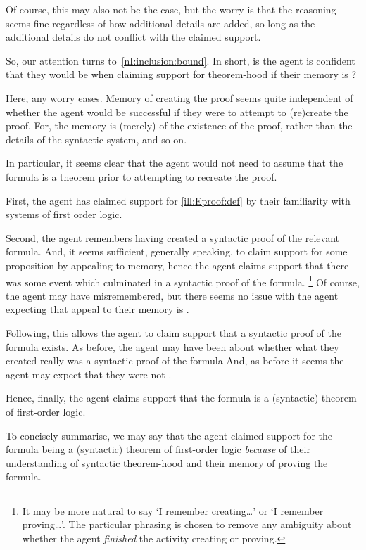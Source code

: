 \begin{note}[Memory]
{      Of course, this may also not be the case, but the worry is that the reasoning seems fine regardless of how additional details are added, so long as the additional details do not conflict with the claimed support.

      So, our attention turns to~\ref{nI:inclusion:bound}.
      In short, is the agent is confident that they would be \nmom{} when claiming support for theorem-hood if their memory is \nmom{}?

      Here, any worry eases.
      Memory of creating the proof seems quite independent of whether the agent would be successful if they were to attempt to (re)create the proof.
      For, the memory is (merely) of the existence of the proof, rather than the details of the syntactic system, and so on.

      In particular, it seems clear that the agent would not need to assume that the formula is a theorem prior to attempting to recreate the proof.
    }

  First, the agent has claimed support for \ref{ill:Eproof:def} by their familiarity with systems of first order logic.

  Second, the agent remembers having created a syntactic proof of the relevant formula.
  And, it seems sufficient, generally speaking, to claim support for some proposition by appealing to memory, hence the agent claims support that there was some event which culminated in a syntactic proof of the formula.\nolinebreak
  \footnote{
    It may be more natural to say `I remember creating\dots' or `I remember proving\dots'.
    The particular phrasing is chosen to remove any ambiguity about whether the agent \emph{finished} the activity creating or proving.
  }
  Of course, the agent may have misremembered, but there seems no issue with the agent expecting that appeal to their memory is \nmom{}.

  Following, this allows the agent to claim support that a syntactic proof of the formula exists.
  As before, the agent may have been \mom{} about whether what they created really was a syntactic proof of the formula
  And, as before it seems the agent may expect that they were not \mom{}.

  Hence, finally, the agent claims support that the formula is a (syntactic) theorem of first-order logic.

  To concisely summarise, we may say that the agent claimed support for the formula being a (syntactic) theorem of first-order logic \emph{because} of their understanding of syntactic theorem-hood and their memory of proving the formula.


\end{note}
